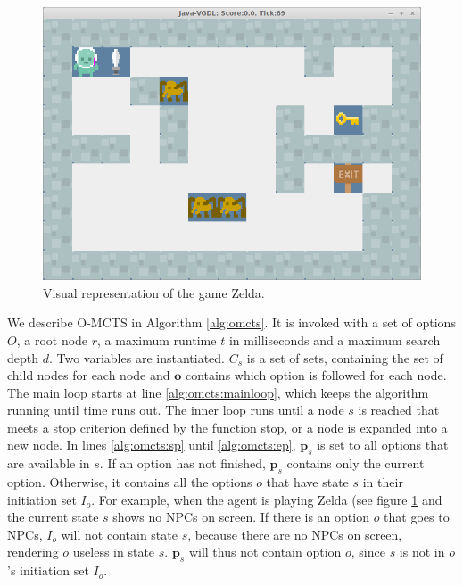 \begin{figure}
	\centering
	\includegraphics[width=\columnwidth]{includes/zelda}
	\caption{Visual representation of the game Zelda.}
	\label{fig:zelda}
\end{figure}


We describe O-MCTS in Algorithm \ref{alg:omcts}. It is invoked with a set of
options $O$, a root node $r$, a maximum runtime $t$ in milliseconds and a
maximum search depth $d$. Two variables are instantiated. $C_s$ is a set of
sets, containing the set of child nodes for each node and $\mathbf{o}$ contains
which option is followed for each node. The main loop starts at line
\ref{alg:omcts:mainloop}, which keeps the algorithm running until time runs out.
The inner loop runs until a node $s$ is reached that meets a stop criterion
defined by the function \textsf{stop}, or a node is expanded into a new node.
In lines \ref{alg:omcts:sp} until \ref{alg:omcts:ep}, $\mathbf{p}_s$ is set to
all options that are available in $s$. If an option has not finished,
$\mathbf{p}_s$ contains only the current option. Otherwise, it contains all the
options $o$ that have state $s$ in their initiation set $I_o$. For example, when
the agent is playing Zelda (see figure \ref{fig:zelda} and the current state $s$
shows no NPCs on screen. If there is an option $o$ that goes to NPCs, $I_o$ will
not contain state $s$, because there are no NPCs on screen, rendering $o$
useless in state $s$. $\mathbf{p}_s$ will thus not contain option $o$, since $s$
is not in $o$'s initiation set $I_o$.

